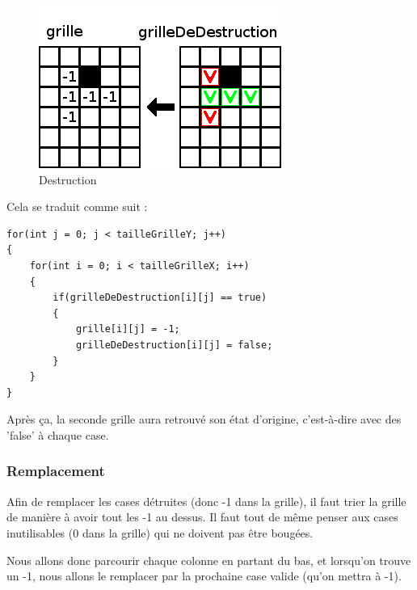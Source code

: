 \begin{figure}[h]
	\center
	\caption{\label{Destruction} Destruction}
	\includegraphics{imgs/Destruction}
\end{figure}

Cela se traduit comme suit :

\begin{lstlisting}
for(int j = 0; j < tailleGrilleY; j++)
{
	for(int i = 0; i < tailleGrilleX; i++)
	{
		if(grilleDeDestruction[i][j] == true)
		{
			grille[i][j] = -1;
			grilleDeDestruction[i][j] = false;
		}
	}
}
\end{lstlisting}

Après ça, la seconde grille aura retrouvé son état d'origine, c'est-à-dire avec des 'false' à chaque case.

\subsubsection{Remplacement}

	Afin de remplacer les cases détruites (donc -1 dans la grille), il faut trier la grille de manière à avoir tout les -1 au dessus.
	Il faut tout de même penser aux cases inutilisables (0 dans la grille) qui ne doivent pas être bougées.
	
	Nous allons donc parcourir chaque colonne en partant du bas, et lorsqu'on trouve un -1, nous allons le remplacer par la prochaine case valide (qu'on mettra à -1).
	
